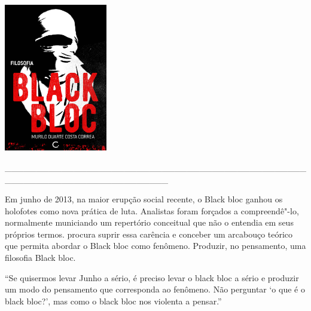 \pagestyle{circuito}
\label{circuito}

\hspace{.5cm}

\begin{center}
\hspace*{-2.5cm}
\hspace{2cm}\includegraphics[width=45mm]{./imgs/blackbloc.jpg}
\end{center}

\hspace*{-2cm}\_\_\_\_\_\_\_\_\_\_\_\_\_\_\_\_\_\_\_\_\_\_\_\_\_\_\_\_\_\_\_\_\_\_\_\_\_\_\_\_\_\_\_\_\_\_\_\_\_\_\_\_\_\_\_\_\_\_\_\_\_\_\_\_\_\_\_\_\_\_\_\_\_\_

\medskip

\noindent{}Em junho de 2013, na maior erupção social recente, o Black bloc ganhou os holofotes como nova prática de luta. Analistas foram forçados a compreendê"-lo, normalmente municiando um repertório conceitual que não o entendia em seus próprios termos. {} procura suprir essa carência e conceber um arcabouço teórico que permita abordar o Black bloc como fenômeno. Produzir, no pensamento, uma filosofia Black bloc.

\hspace{.5cm}

\hspace*{-.4cm}\begin{minipage}[c]{0.45\linewidth}
\small{
{}}
\end{minipage}
\begin{minipage}[c]{0.50\linewidth}
\small{``Se quisermos levar Junho a sério, é preciso levar o black bloc a sério e produzir um modo do pensamento que corresponda ao fenômeno. Não perguntar `o que é o black bloc?', mas como o black bloc nos violenta a pensar.''} 
\end{minipage}

